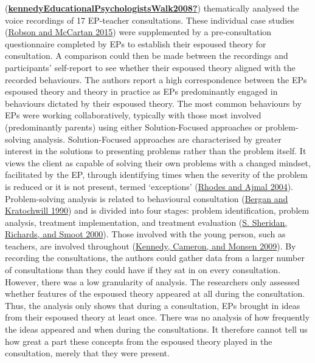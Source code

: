 \documentclass[
]{article}
\begin{document}
(\protect\hyperlink{ref-kennedyEducationalPsychologistsWalk2008}{\textbf{kennedyEducationalPsychologistsWalk2008?}})
thematically analysed the voice recordings of 17 EP-teacher
consultations. These individual case studies
(\protect\hyperlink{ref-robsonRealWorldResearch2015}{Robson and McCartan
2015}) were supplemented by a pre-consultation questionnaire completed
by EPs to establish their espoused theory for consultation. A comparison
could then be made between the recordings and participants' self-report
to see whether their espoused theory aligned with the recorded
behaviours. The authors report a high correspondence between the EPs
espoused theory and theory in practice as EPs predominantly engaged in
behaviours dictated by their espoused theory. The most common behaviours
by EPs were working collaboratively, typically with those most involved
(predominantly parents) using either Solution-Focused approaches or
problem-solving analysis. Solution-Focused approaches are characterised
by greater interest in the solutions to presenting problems rather than
the problem itself. It views the client as capable of solving their own
problems with a changed mindset, facilitated by the EP, through
identifying times when the severity of the problem is reduced or it is
not present, termed `exceptions'
(\protect\hyperlink{ref-rhodesSolutionFocusedThinking2004a}{Rhodes and
Ajmal 2004}). Problem-solving analysis is related to behavioural
consultation
(\protect\hyperlink{ref-berganBehavioralConsultationTherapy1990}{Bergan
and Kratochwill 1990}) and is divided into four stages: problem
identification, problem analysis, treatment implementation, and
treatment evaluation
(\protect\hyperlink{ref-sheridanSchoolConsultation2000}{S. Sheridan,
Richards, and Smoot 2000}). Those involved with the young person, such
as teachers, are involved throughout
(\protect\hyperlink{ref-kennedyEffectiveConsultationEducational2009a}{Kennedy,
Cameron, and Monsen 2009}). By recording the consultations, the authors
could gather data from a larger number of consultations than they could
have if they sat in on every consultation. However, there was a low
granularity of analysis. The researchers only assessed whether features
of the espoused theory appeared at all during the consultation. Thus,
the analysis only shows that during a consultation, EPs brought in ideas
from their espoused theory at least once. There was no analysis of how
frequently the ideas appeared and when during the consultations. It
therefore cannot tell us how great a part these concepts from the
espoused theory played in the consultation, merely that they were
present.
\end{document}
